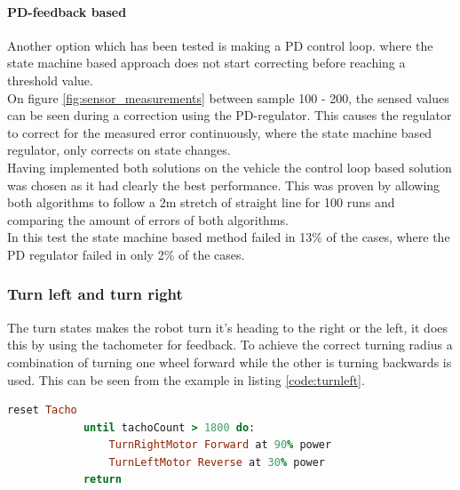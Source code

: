 \documentclass[final, english, a4paper]{article}
\begin{document}
            \paragraph{PD-feedback based}
            Another option which has been tested is making a PD control loop.
            where the state machine based approach does not start correcting before reaching a threshold value.\\
            On figure \ref{fig:sensor_measurements} between sample 100 - 200,
            the sensed values can be seen during a correction using the PD-regulator.
            This causes the regulator to correct for the measured error 
            continuously, where the state machine based regulator, only corrects on state
            changes.
            \\
            Having implemented both solutions on the vehicle the control loop based
            solution was chosen as it had clearly the best performance. This
            was proven by allowing both algorithms to follow a 2m stretch of
            straight line for 100 runs and comparing the amount of errors of both algorithms.
            \\
            In this test the state machine based method failed in 13\% of the
            cases, where the PD regulator failed in only 2\% of the cases.
             
            
            
	    \subsubsection{Turn left and turn right}
	        The turn states makes the robot turn it's heading to
	        the right or the left,
	        it does this by using the tachometer for feedback.
	        To achieve the correct turning radius a combination of turning one
	        wheel forward while the other is turning backwards is used. This
	        can be seen from the example in listing \ref{code:turnleft}.
	        \begin{lstlisting}[language=Ruby, frame=single, basicstyle=\small, caption={TurnLeft Pseudo example}, label={code:turnleft}]
	        reset Tacho
	        until tachoCount > 1800 do:
	            TurnRightMotor Forward at 90% power
	            TurnLeftMotor Reverse at 30% power
	        return
	        \end{lstlisting}
\end{document}
